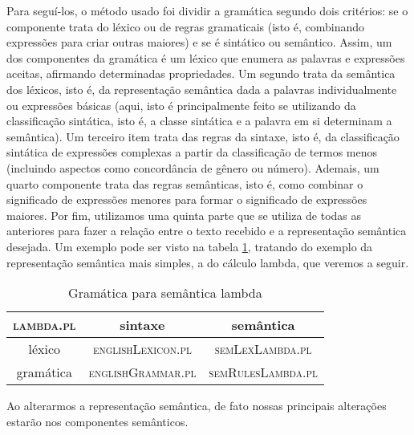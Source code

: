 	Para seguí-los, o método usado foi dividir a gramática segundo dois critérios: se o componente trata do léxico ou de regras gramaticais (isto é, combinando expressões para criar outras maiores) e se é sintático ou semântico. Assim, um dos componentes da gramática é um léxico que enumera as palavras e expressões aceitas, afirmando determinadas propriedades. Um segundo trata da semântica dos léxicos, isto é, da representação semântica dada a palavras individualmente ou expressões básicas (aqui, isto é principalmente feito se utilizando da classificação sintática, isto é, a classe sintática e a palavra em si determinam a semântica). Um terceiro item trata das regras da sintaxe, isto é, da classificação sintática de expressões complexas a partir da classificação de termos menos (incluindo aspectos como concordância de gênero ou número). Ademais, um quarto componente trata das regras semânticas, isto é, como combinar o significado de expressões menores para formar o significado de expressões maiores. Por fim, utilizamos uma quinta parte que se utiliza de todas as anteriores para fazer a relação entre o texto recebido e a representação semântica desejada. Um exemplo pode ser visto na tabela \ref{curt-gramatica}, tratando do exemplo da representação semântica mais simples, a do cálculo lambda, que veremos a seguir.
	
	
	\begin{table}[h]
		\centering
		\begin{tabular}{|c|c|c|}
				\hline \textsc{lambda.pl} & sintaxe & semântica \\ 
				\hline léxico & \textsc{englishLexicon.pl} & \textsc{semLexLambda.pl} \\ 
				\hline gramática & \textsc{englishGrammar.pl} & \textsc{semRulesLambda.pl} \\ 
				\hline 
		\end{tabular}
		\caption{Gramática para semântica lambda}
		\label{curt-gramatica}
	\end{table}
		 
	Ao alterarmos a representação semântica, de fato nossas principais alterações estarão nos componentes semânticos.
	
